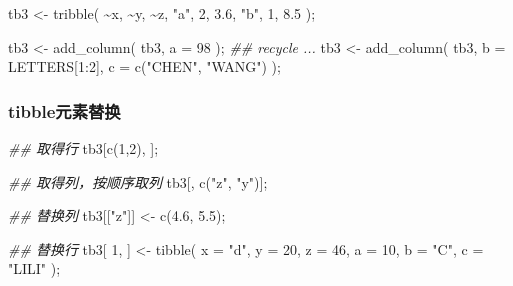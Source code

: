 \documentclass[
]{article}
\newenvironment{Shaded}{}{}
\newcommand{\AttributeTok}[1]{\textcolor[rgb]{0.49,0.56,0.16}{#1}}
\newcommand{\DecValTok}[1]{\textcolor[rgb]{0.25,0.63,0.44}{#1}}
\newcommand{\DocumentationTok}[1]{\textcolor[rgb]{0.73,0.13,0.13}{\textit{#1}}}
\newcommand{\FloatTok}[1]{\textcolor[rgb]{0.25,0.63,0.44}{#1}}
\newcommand{\FunctionTok}[1]{\textcolor[rgb]{0.02,0.16,0.49}{#1}}
\newcommand{\NormalTok}[1]{#1}
\newcommand{\OtherTok}[1]{\textcolor[rgb]{0.00,0.44,0.13}{#1}}
\newcommand{\SpecialCharTok}[1]{\textcolor[rgb]{0.25,0.44,0.63}{#1}}
\newcommand{\StringTok}[1]{\textcolor[rgb]{0.25,0.44,0.63}{#1}}
\begin{document}
\begin{Shaded}
\begin{Highlighting}[]
\NormalTok{tb3 }\OtherTok{\textless{}{-}} \FunctionTok{tribble}\NormalTok{(}
  \SpecialCharTok{\textasciitilde{}}\NormalTok{x, }\SpecialCharTok{\textasciitilde{}}\NormalTok{y,  }\SpecialCharTok{\textasciitilde{}}\NormalTok{z,}
  \StringTok{"a"}\NormalTok{, }\DecValTok{2}\NormalTok{,  }\FloatTok{3.6}\NormalTok{,}
  \StringTok{"b"}\NormalTok{, }\DecValTok{1}\NormalTok{,  }\FloatTok{8.5}
\NormalTok{);}

\NormalTok{tb3 }\OtherTok{\textless{}{-}} \FunctionTok{add\_column}\NormalTok{( tb3, }\AttributeTok{a =} \DecValTok{98}\NormalTok{ ); }\DocumentationTok{\#\# recycle ... }
\NormalTok{tb3 }\OtherTok{\textless{}{-}} \FunctionTok{add\_column}\NormalTok{( tb3, }\AttributeTok{b =}\NormalTok{ LETTERS[}\DecValTok{1}\SpecialCharTok{:}\DecValTok{2}\NormalTok{], }\AttributeTok{c =} \FunctionTok{c}\NormalTok{(}\StringTok{"CHEN"}\NormalTok{, }\StringTok{"WANG"}\NormalTok{) ); }
\end{Highlighting}
\end{Shaded}

\hypertarget{tibbleux5143ux7d20ux66ffux6362}{%
\subsubsection{tibble元素替换}\label{tibbleux5143ux7d20ux66ffux6362}}

\begin{Shaded}
\begin{Highlighting}[]
\DocumentationTok{\#\# 取得行}
\NormalTok{tb3[}\FunctionTok{c}\NormalTok{(}\DecValTok{1}\NormalTok{,}\DecValTok{2}\NormalTok{), ];}

\DocumentationTok{\#\# 取得列，按顺序取列}
\NormalTok{tb3[, }\FunctionTok{c}\NormalTok{(}\StringTok{"z"}\NormalTok{, }\StringTok{"y"}\NormalTok{)];}

\DocumentationTok{\#\# 替换列 }
\NormalTok{tb3[[}\StringTok{"z"}\NormalTok{]] }\OtherTok{\textless{}{-}} \FunctionTok{c}\NormalTok{(}\FloatTok{4.6}\NormalTok{, }\FloatTok{5.5}\NormalTok{);}

\DocumentationTok{\#\# 替换行 }
\NormalTok{tb3[ }\DecValTok{1}\NormalTok{, ] }\OtherTok{\textless{}{-}} \FunctionTok{tibble}\NormalTok{( }\AttributeTok{x =} \StringTok{"d"}\NormalTok{, }\AttributeTok{y =} \DecValTok{20}\NormalTok{, }\AttributeTok{z =} \DecValTok{46}\NormalTok{, }\AttributeTok{a =} \DecValTok{10}\NormalTok{, }\AttributeTok{b =} \StringTok{"C"}\NormalTok{, }\AttributeTok{c =} \StringTok{"LILI"}\NormalTok{ );}
\end{Highlighting}
\end{Shaded}
\end{document}
